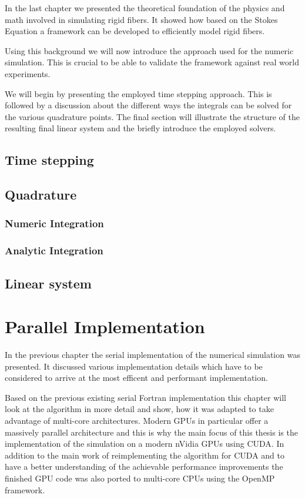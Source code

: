 \documentclass[a4paper,11pt]{kth-mag}
\begin{document}
In the last chapter we presented the theoretical foundation of the physics and math involved in simulating rigid fibers. It showed how based on the Stokes Equation a framework can be developed to efficiently model rigid fibers.

Using this background we will now introduce the approach used for the numeric simulation. This is crucial to be able to validate the framework against real world experiments.

We will begin by presenting the employed time stepping approach. This is followed by a discussion about the different ways the integrals can be solved for the various quadrature points. The final section will illustrate the structure of the resulting final linear system and the briefly introduce the employed solvers.

\section{Time stepping}
\label{sec:time_stepping}

\section{Quadrature}
\label{sec:quadrature}
\subsection{Numeric Integration}
\subsection{Analytic Integration}
\section{Linear system}

\chapter{Parallel Implementation}
In the previous chapter the serial implementation of the numerical simulation was presented. It discussed various implementation details which have to be considered to arrive at the most efficent and performant implementation.

Based on the previous existing serial Fortran implementation this chapter will look at the algorithm in more detail and show, how it was adapted to take advantage of multi-core architectures. Modern GPUs in particular offer a massively parallel architecture and this is why the main focus of this thesis is the implementation of the simulation on a modern nVidia GPUs using CUDA. In addition to the main work of reimplementing the algorithm for CUDA and to have a better understanding of the achievable performance improvements the finished GPU code was also ported to multi-core CPUs using the OpenMP framework.
\end{document}
